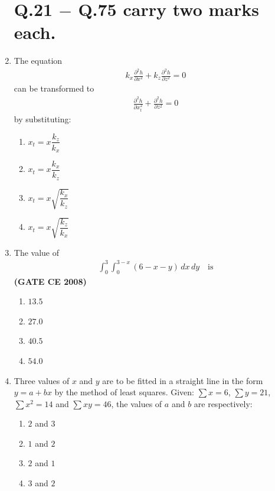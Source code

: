 \documentclass[journal]{IEEEtran}
\begin{document}
\begin{enumerate}
\section*{Q.21 $-$ Q.75 carry two marks each.}

\item The equation 
\begin{align}
k_x \frac{\partial^2 h}{\partial x^2} + k_z \frac{\partial^2 h}{\partial z^2} = 0
\end{align}
can be transformed to \begin{align}
\frac{\partial^2 h}{\partial x_t^2} + \frac{\partial^2 h}{\partial z^2} = 0
\end{align}
by substituting: \textbf{}
\begin{multicols}{2}
\begin{enumerate}
\item $x_t = x \dfrac{k_z}{k_x}$
\item $x_t = x \dfrac{k_x}{k_z}$
\item $x_t = x \sqrt{\dfrac{k_x}{k_z}}$
\item $x_t = x \sqrt{\dfrac{k_z}{k_x}}$
\end{enumerate}
\end{multicols}

\item The value of 
\begin{align}
\int_0^3 \int_0^{3-x} (6 - x - y) \, dx \, dy \quad \text{is}
\end{align}
\textbf{(GATE CE 2008)}
\begin{multicols}{2}
\begin{enumerate}
\item $13.5$
\item $27.0$
\item $40.5$
\item $54.0$
\end{enumerate}
\end{multicols}

\item Three values of $x$ and $y$ are to be fitted in a straight line in the form $y = a + bx$ by the method of least squares. Given: $\sum x = 6$, $\sum y = 21$, $\sum x^2 = 14$ and $\sum xy = 46$, the values of $a$ and $b$ are respectively: \textbf{}
\begin{multicols}{2}
\begin{enumerate}
\item $2$ and $3$
\item $1$ and $2$
\item $2$ and $1$
\item $3$ and $2$
\end{enumerate}
\end{multicols}


\end{enumerate}
\end{document}
